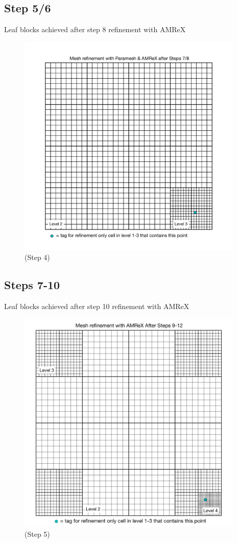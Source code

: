 \documentclass[12pt,letterpaper]{article}
\begin{document}
\newpage
\subsection{Step 5/6}
Leaf blocks achieved after step 8 refinement with AMReX
\begin{figure}[!hp]
\begin{center}
\includegraphics[width=4.25in]{TestRefine_Step6_Both.pdf}
\caption{(Step 4) }
\end{center}
\end{figure}

\newpage
\subsection{Steps 7-10}
Leaf blocks achieved after step 10 refinement with AMReX
\begin{figure}[!hp]
\begin{center}
\includegraphics[width=4.25in]{TestRefine_Step8_Both.pdf}
\caption{(Step 5) }
\end{center}
\end{figure}
\end{document}
